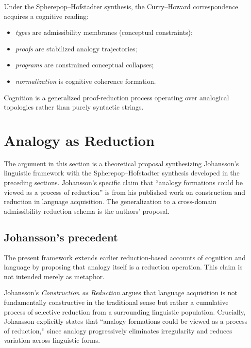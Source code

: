 \documentclass[12pt, a4paper]{article}
\theoremstyle{plain}
\theoremstyle{definition}
\theoremstyle{remark}
\begin{document}
Under the Spherepop--Hofstadter synthesis, the Curry--Howard
correspondence acquires a cognitive reading:
\begin{itemize}
  \item \emph{types} are admissibility membranes (conceptual constraints);
  \item \emph{proofs} are stabilized analogy trajectories;
  \item \emph{programs} are constrained conceptual collapses;
  \item \emph{normalization} is cognitive coherence formation.
\end{itemize}
Cognition is a generalized proof-reduction process operating over
analogical topologies rather than purely syntactic strings.

\section{Analogy as Reduction}
\label{sec:analogy-reduction}

\begin{speculative}
  The argument in this section is a theoretical proposal synthesizing
  Johansson's linguistic framework with the Spherepop--Hofstadter
  synthesis developed in the preceding sections.
  Johansson's specific claim that ``analogy formations could be viewed
  as a process of reduction'' is from his published work on
  construction and reduction in language acquisition.
  The generalization to a cross-domain admissibility-reduction schema
  is the authors' proposal.
\end{speculative}

\subsection{Johansson's precedent}

The present framework extends earlier reduction-based accounts of
cognition and language by proposing that analogy itself is a reduction
operation.
This claim is not intended merely as metaphor.

Johansson's \emph{Construction as Reduction} argues that language
acquisition is not fundamentally constructive in the traditional sense
but rather a cumulative process of selective reduction from a
surrounding linguistic population.
Crucially, Johansson explicitly states that ``analogy formations could
be viewed as a process of reduction,'' since analogy progressively
eliminates irregularity and reduces variation across linguistic forms.
\end{document}
